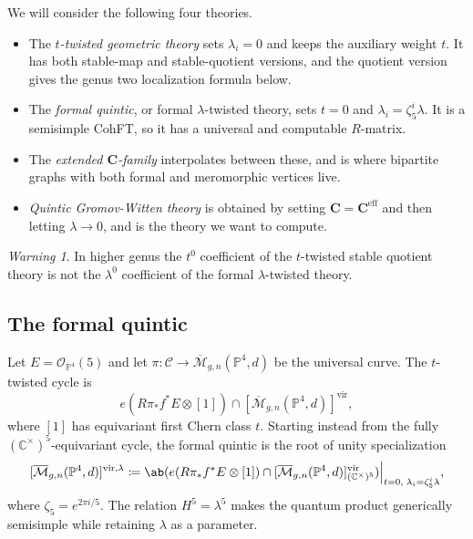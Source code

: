 \documentclass{amsart}
\theoremstyle{definition}
\theoremstyle{remark}
\newtheorem{warn}[thm]{Warning}
\theoremstyle{plain}
\theoremstyle{definition}
\theoremstyle{remark}
\newcommand{\C}{\mathbb{C}}
\renewcommand{\P}{\mathbb{P}}
\newcommand{\Mbar}{\overline{\mathcal{M}}}
\newcommand{\mc}[1]{\mathcal{#1}}
\newcommand{\mbf}[1]{\mathbf{#1}}
\newcommand{\mr}[1]{\mathrm{#1}}
\newcommand{\1}{\mathbf{1}}
\newcommand{\2}{\mathbf{2}}
\newcommand{\3}{\mathbf{3}}
\newcommand{\vir}{\mr{vir}}
\begin{document}
We will consider the following four theories.
\begin{itemize}
    \item The \textit{\(t\)-twisted geometric theory} sets \(\lambda_i = 0\) and keeps the auxiliary weight \(t\). It has both stable-map and stable-quotient versions, and the quotient version gives the genus two localization formula below.
    \item The \textit{formal quintic}, or formal \(\lambda\)-twisted theory, sets \(t = 0\) and \(\lambda_i = \zeta_5^i \lambda\). It is a semisimple CohFT, so it has a universal and computable \(R\)-matrix.
    \item The \textit{extended \(\mbf{C}\)-family} interpolates between these, and is where bipartite graphs with both formal and meromorphic vertices live.
    \item \textit{Quintic Gromov-Witten theory} is obtained by setting \(\mbf{C} = \mbf{C}^{\mr{eff}}\) and then letting \(\lambda \to 0\), and is the theory we want to compute.
\end{itemize}

\begin{warn}
    In higher genus the \(t^0\) coefficient of the \(t\)-twisted stable quotient theory is not the \(\lambda^0\) coefficient of the formal \(\lambda\)-twisted theory.
\end{warn}

\subsection{The formal quintic}%
\label{sub:The formal quintic}

Let \(E = \mc{O}_{\P^4}(5)\) and let \(\pi \colon \mc{C} \to \Mbar_{g,n}(\P^4,d)\) be the universal curve. The \(t\)-twisted cycle is
\[ e(R\pi_* f^* E \otimes [1]) \cap [\Mbar_{g,n}(\P^4,d)]^{\vir}, \]
where \([1]\) has equivariant first Chern class \(t\). Starting instead from the fully \((\C^{\times})^5\)-equivariant cycle, the formal quintic is the root of unity specialization
\[ [\Mbar_{g,n}(\P^4,d)]^{\vir,\lambda} \coloneqq \ab( e(R\pi_*f^*E \otimes [1]) \cap [\Mbar_{g,n}(\P^4,d)]^{\vir}_{(\C^{\times})^5})\Big|_{t=0, \; \lambda_i = \zeta_5^i \lambda}, \]
where \(\zeta_5 = e^{2\pi i/5}\). The relation \(H^5 = \lambda^5\) makes the quantum product generically semisimple while retaining \(\lambda\) as a parameter.
\end{document}
